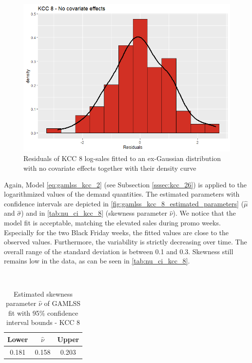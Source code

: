\begin{figure}[H]
\centering
  \includegraphics[width=0.45\linewidth]{figures/res_kcc_8_no_covariates.png}
  \caption{Residuals of KCC 8 log-sales fitted to an ex-Gaussian distribution with no covariate effects together with their density curve}
  \label{fig:res_kcc_8_no_covariates}
\end{figure}




Again, Model \ref{eq:gamlss_kcc_2} (see Subsection \ref{sssec:kcc_26}) is applied to the logarithmized values of the demand quantities. The estimated parameters with confidence intervals are depicted in \autoref{fig:gamlss_kcc_8_estimated_parameters} ($\hat{\mu}$ and $\hat{\sigma}$) and in \autoref{tab:nu_ci_kcc_8} (skewness parameter $\hat{\nu}$). We notice that the model fit is acceptable, matching the elevated sales during promo weeks. Especially for the two Black Friday weeks, the fitted values are close to the observed values. Furthermore, the variability is strictly decreasing over time. The overall range of the standard deviation is between 0.1 and 0.3. Skewness still remains low in the data, as can be seen in \autoref{tab:nu_ci_kcc_8}.
\\



\begin{table}[H]
\setlength\arrayrulewidth{1pt}  
\centering
\begin{adjustbox}{max width=\textwidth}\
\begin{tabular}{c|c|c}
\hline
\rowcolor{white} 
\textbf{Lower} & $\hat{\nu}$ & \textbf{Upper} \\ \hline\hline
0.181        & 0.158           & 0.203        \\ \hline
\end{tabular}
\end{adjustbox}
\caption{Estimated skewness parameter $\hat{\nu}$ of GAMLSS fit with 95\% confidence interval bounds - KCC 8}
\label{tab:nu_ci_kcc_8}
\end{table}









